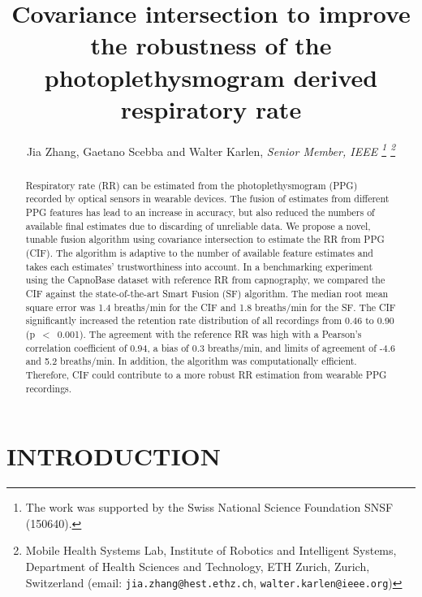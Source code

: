 \documentclass[letterpaper, 10 pt, conference]{ieeeconf}
\title{\LARGE \bf
Covariance intersection to improve the robustness of the photoplethysmogram derived respiratory rate}
\author{Jia Zhang, Gaetano Scebba and Walter Karlen, \it{Senior Member}, IEEE%
\thanks{The work was supported by the Swiss National Science Foundation SNSF (150640).}%
\thanks{Mobile Health Systems Lab, Institute of Robotics and Intelligent Systems, Department of Health Sciences and Technology, ETH Zurich, Zurich, Switzerland (email:
		{\tt\small jia.zhang@hest.ethz.ch},
        {\tt\small walter.karlen@ieee.org})}%
}
\begin{document}
    \maketitle

\thispagestyle{empty}
\pagestyle{empty}


\begin{abstract}
Respiratory rate (RR) can be estimated from the photoplethysmogram (PPG) recorded by optical sensors in wearable devices. The fusion of estimates from different PPG features has lead to an increase in accuracy, but also reduced the numbers of available final estimates due to discarding of unreliable data. We propose a novel, tunable fusion algorithm using covariance intersection to estimate the RR from PPG (CIF). The algorithm is adaptive to the number of available feature estimates and takes each estimates' trustworthiness into account. In a benchmarking experiment using the CapnoBase dataset with reference RR from capnography, we compared the CIF  against the state-of-the-art Smart Fusion (SF) algorithm. The median root mean square error was 1.4 breaths/min for the CIF and 1.8 breaths/min for the SF. The CIF significantly increased the retention rate distribution of all recordings from 0.46 to 0.90 (p~$<$~0.001). The agreement with the reference RR was high with a Pearson's correlation coefficient of 0.94, a bias of 0.3 breaths/min, and limits of agreement of -4.6 and 5.2 breaths/min. In addition, the algorithm was computationally efficient. Therefore, CIF could contribute to a more robust RR estimation from  wearable PPG recordings.

\end{abstract}


\section{INTRODUCTION}

\end{document}

